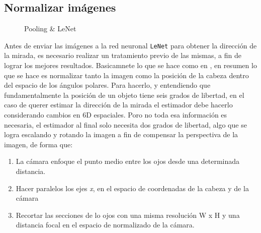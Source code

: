 \documentclass[12pt]{book} %
\begin{document}
	\subsection{Normalizar imágenes}
		\begin{figure}[t]
			\centering
			 \hspace{2cm}
			\caption{Pooling \& LeNet}
		\end{figure}
		Antes de enviar las imágenes a la red neuronal \texttt{LeNet} para obtener la dirección de la mirada, es necesario realizar un 
		tratamiento previo de las mismas, a fin de lograr los mejores resultados.
		Basicamnete lo que se hace como en \cite{Sugano}, en resumen lo que se hace es normalizar tanto la imagen como la posición de 
		la cabeza dentro del espacio de los ángulos polares. 
		Para hacerlo, y entendiendo que fundamentalmente la posición de un objeto tiene seis grados de libertad, en el caso de querer 
		estimar la dirección de la mirada el estimador debe hacerlo considerando cambios en 6D espaciales.
		Poro no toda esa información es necesaria, el estimador al final solo necesita dos grados de libertad, algo que se logra escalando 
		y rotando la imagen a fin de compensar la perspectiva de la imagen, de forma que:
		\begin{multicols}{2}
			\begin{enumerate}
				\item La cámara enfoque el punto medio entre los ojos desde una determinada distancia.
				\item Hacer paralelos los ejes \textit{x}, en el espacio de coordenadas de la cabeza y de la cámara 
				\item Recortar las secciones de lo ojos con una misma resolución \textsf{W x H} y una distancia focal en el espacio de normalizado
					de la cámara.\\
			\end{enumerate}
		\end{multicols}
\end{document}
